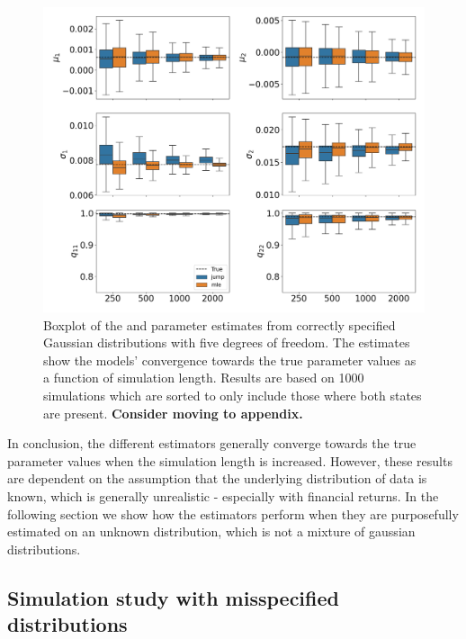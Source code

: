 \begin{figure}[H] 
    \centering
    \includegraphics[width=1\textwidth]{analysis/model_convergence/images/simulation_normal_box_2states.png}
    
    \caption [Boxplot of \mle and \jump parameter estimates from correctly specified conditional Gaussian distributions with five degrees of freedom. Sorted version] {Boxplot of the \mle and \jump parameter estimates from correctly specified Gaussian distributions with five degrees of freedom. The estimates show the models' convergence towards the true parameter values as a function of simulation length. Results are based on 1000 simulations which are sorted to only include those where both states are present. \textbf{Consider moving to appendix.}}
    \label{fig:jump_normal_box_2states}
\end{figure}

In conclusion, the different estimators generally converge towards the true parameter values when the simulation length is increased. However, these results are dependent on the assumption that the underlying distribution of data is known, which is generally unrealistic - especially with financial returns. In the following section we show how the estimators perform when they are purposefully estimated on an unknown distribution, which is not a mixture of gaussian distributions.


\subsection{Simulation study with misspecified distributions}
\label{section:simulation_misspecified}

